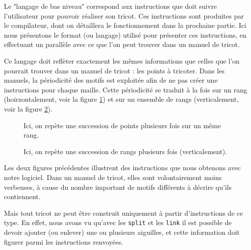 \documentclass{article}
\begin{document}
Le "langage de bas niveau" correspond aux instructions que doit suivre l'utilisateur 
pour pouvoir réaliser son tricot. Ces instructions sont produites par le compilateur, 
dont on détaillera le fonctionnement dans la prochaine partie. Ici nous présentons le 
format (ou langage) utilisé pour présenter ces instructions, en effectuant un parallèle 
avec ce que l'on peut trouver dans un manuel de tricot.

Ce langage doit reflèter exactement les mêmes informations que celles que l'on pourrait 
trouver dans un manuel de tricot : les points à tricoter. Dans les manuels, la périodicité 
des motifs est exploitée afin de ne pas créer une instructions pour chaque maille. Cette 
périodicité se traduit à la fois sur un rang (hoirzontalement, voir la figure \ref{instruction1}) 
et sur un ensemble de rangs (verticalement, voir la figure \ref{instruction2}).  

\begin{figure}[!ht]
	\centering
	\caption{Ici, on repète une succession de points plusieurs fois sur un même rang.}
	\label{instruction1}
\end{figure}

\begin{figure}[!ht]
	\centering
	\caption{Ici, on repète une succession de rangs plusieurs fois (verticalement).}
	\label{instruction2}
\end{figure}

Les deux figures précédentes illustrent des instructions que nous obtenons avec notre logiciel. 
Dans un manuel de tricot, elles sont volontairement moins verbeuses, à cause du nombre important 
de motifs différents à décrire qu'ils contiennent.

Mais tout tricot ne peut être construit uniquement à partir d'instructions de ce type. En effet, nous 
avons vu qu'avec les \texttt{split} et les \texttt{link} il est possible de devoir ajouter (ou enlever) 
une ou plusieurs aiguilles, et cette information doit figurer parmi les instructions renvoyées.
\end{document}
